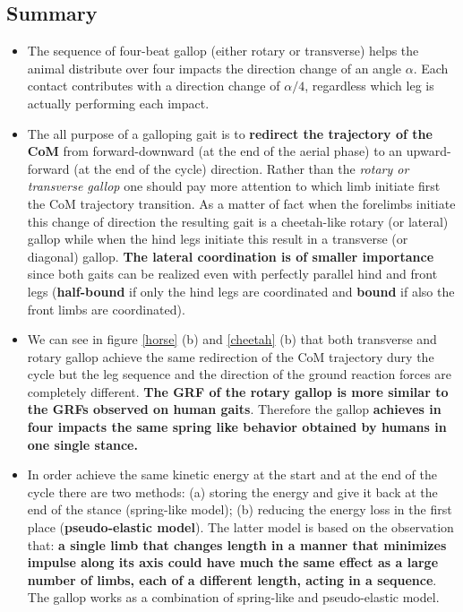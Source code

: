 \subsection*{Summary}
\begin{itemize}
\item The sequence of four-beat gallop (either rotary or transverse) helps the animal distribute over four impacts the direction change of an angle $\alpha$. Each contact contributes with a direction change of $\alpha/4$, regardless which leg is actually performing each impact.

\item The all purpose of a galloping gait is to \textbf{redirect the trajectory of the CoM} from forward-downward (at the end of the aerial phase) to an upward-forward (at the end of the cycle) direction. Rather than the \textit{rotary or transverse gallop} one should pay more attention to which limb initiate first the CoM trajectory transition. As a matter of fact when the forelimbs initiate this change of direction the resulting gait is a cheetah-like rotary (or lateral) gallop while when the hind legs initiate this result in a transverse (or diagonal) gallop. \textbf{The lateral coordination is of smaller importance} since both gaits can be realized even with perfectly parallel hind and front legs (\textbf{half-bound} if only the hind legs are coordinated and \textbf{bound} if also the front limbs are coordinated).

\item We can see in figure \ref{horse} (b) and \ref{cheetah} (b) that both transverse and rotary gallop achieve the same redirection of the CoM trajectory dury the cycle but the leg sequence and the direction of the ground reaction forces are completely different. \textbf{The GRF of the rotary gallop is more similar to the GRFs observed on human gaits}. Therefore the gallop \textbf{achieves in four impacts the same spring like behavior obtained by humans in one single stance.}

\item In order achieve the same kinetic energy at the  start and at the end of the cycle there are two methods: (a) storing the energy and give it back at the end of the stance (spring-like model); (b) reducing the energy loss in the first place (\textbf{pseudo-elastic model}). The latter model is based on the observation that: \textbf{a single limb that changes length in a manner that minimizes impulse along its axis could have much the same effect as a large number of limbs, each of a different length, acting in a sequence}.\\
The gallop works as a combination of spring-like and pseudo-elastic model.

\end{itemize}